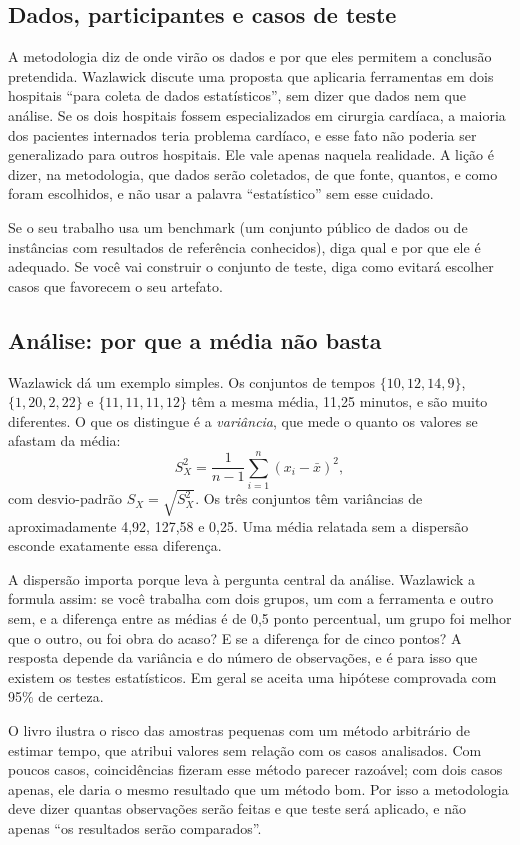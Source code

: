 \documentclass[10pt,a4paper]{extarticle}
\theoremstyle{definition}
\begin{document}
\subsection{Dados, participantes e casos de teste}

A metodologia diz de onde virão os dados e por que eles permitem a conclusão pretendida. Wazlawick discute uma proposta que aplicaria ferramentas em dois hospitais \enquote{para coleta de dados estatísticos}, sem dizer que dados nem que análise. Se os dois hospitais fossem especializados em cirurgia cardíaca, a maioria dos pacientes internados teria problema cardíaco, e esse fato não poderia ser generalizado para outros hospitais. Ele vale apenas naquela realidade. A lição é dizer, na metodologia, que dados serão coletados, de que fonte, quantos, e como foram escolhidos, e não usar a palavra \enquote{estatístico} sem esse cuidado.

Se o seu trabalho usa um benchmark (um conjunto público de dados ou de instâncias com resultados de referência conhecidos), diga qual e por que ele é adequado. Se você vai construir o conjunto de teste, diga como evitará escolher casos que favorecem o seu artefato.

\subsection{Análise: por que a média não basta}

Wazlawick dá um exemplo simples. Os conjuntos de tempos $\{10, 12, 14, 9\}$, $\{1, 20, 2, 22\}$ e $\{11, 11, 11, 12\}$ têm a mesma média, 11,25 minutos, e são muito diferentes. O que os distingue é a \emph{variância}, que mede o quanto os valores se afastam da média:
\[
S_X^2=\frac{1}{n-1}\sum_{i=1}^{n}(x_i-\bar{x})^2 ,
\]
com desvio-padrão $S_X=\sqrt{S_X^2}$. Os três conjuntos têm variâncias de aproximadamente 4,92, 127,58 e 0,25. Uma média relatada sem a dispersão esconde exatamente essa diferença.

A dispersão importa porque leva à pergunta central da análise. Wazlawick a formula assim: se você trabalha com dois grupos, um com a ferramenta e outro sem, e a diferença entre as médias é de 0,5 ponto percentual, um grupo foi melhor que o outro, ou foi obra do acaso? E se a diferença for de cinco pontos? A resposta depende da variância e do número de observações, e é para isso que existem os testes estatísticos. Em geral se aceita uma hipótese comprovada com 95\% de certeza.

O livro ilustra o risco das amostras pequenas com um método arbitrário de estimar tempo, que atribui valores sem relação com os casos analisados. Com poucos casos, coincidências fizeram esse método parecer razoável; com dois casos apenas, ele daria o mesmo resultado que um método bom. Por isso a metodologia deve dizer quantas observações serão feitas e que teste será aplicado, e não apenas \enquote{os resultados serão comparados}.
\end{document}
